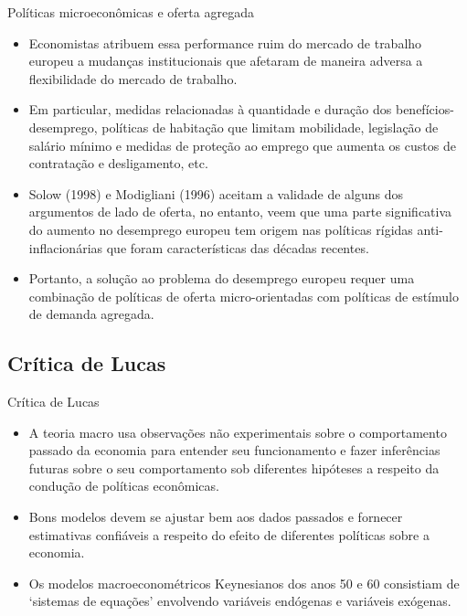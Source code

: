 \documentclass[10pt]{beamer}
\begin{document}
\begin{frame}{Políticas microeconômicas e oferta agregada}
    \begin{itemize}
        \item Economistas atribuem essa performance ruim do mercado de trabalho europeu a mudanças institucionais que afetaram de maneira adversa a flexibilidade do mercado de trabalho.
        \bigskip
        \item Em particular, medidas relacionadas à quantidade e duração dos benefícios-desemprego, políticas de habitação que limitam mobilidade, legislação de salário mínimo e medidas de proteção ao emprego que aumenta os custos de contratação e desligamento, etc.
        \bigskip
        \item Solow (1998) e Modigliani (1996) aceitam a validade de alguns dos argumentos de lado de oferta, no entanto, veem que uma parte significativa do aumento no desemprego europeu tem origem nas políticas rígidas anti-inflacionárias que foram características das décadas recentes.
        \bigskip
        \item Portanto, a solução ao problema do desemprego europeu requer uma combinação de políticas de oferta micro-orientadas com políticas de estímulo de demanda agregada.
    \end{itemize}
\end{frame}

\subsection{Crítica de Lucas}
\begin{frame}{Crítica de Lucas}
    \begin{itemize}
        \item A teoria macro usa observações não experimentais sobre o comportamento passado da economia para entender seu funcionamento e fazer inferências futuras sobre o seu comportamento sob diferentes hipóteses a respeito da condução de políticas econômicas.
        \bigskip
        \item Bons modelos devem se ajustar bem aos dados passados e fornecer estimativas confiáveis a respeito do efeito de diferentes políticas sobre a economia.
        \bigskip
        \item Os modelos macroeconométricos Keynesianos dos anos 50 e 60 consistiam de `sistemas de equações' envolvendo variáveis endógenas e variáveis exógenas.
    \end{itemize}
\end{frame}
\end{document}

